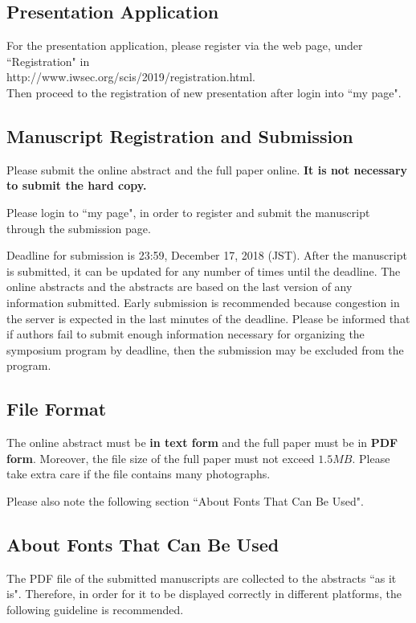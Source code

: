 \documentclass[a4paper]{article}
\begin{document}
\subsection{Presentation Application}

For the presentation application,
please register via the web page, under ``Registration" in \\ \mbox{http://www.iwsec.org/scis/2019/registration.html}.\\
Then proceed to the registration of new presentation after login into ``my page".

\subsection{Manuscript Registration and Submission}

Please submit the online abstract and the full paper online. {\bf It is not necessary to submit the hard copy.}

Please login to ``my page", in order to register and submit the manuscript through the submission page.

Deadline for submission is 23:59, December 17, 2018 (JST). 
After the manuscript is submitted, it can be updated for any number of times until the deadline.
The online abstracts and the abstracts are based on the last version of any information submitted.
Early submission is recommended because congestion in the server is expected in the last minutes of the deadline.
Please be informed that if authors fail to submit enough information necessary for organizing the symposium program
by deadline, then the submission may be excluded from the program.


\subsection{File Format}

The online abstract must be {\bf in text form} and the full paper must be in {\bf PDF form}. Moreover, the file size of the full paper must not exceed $1.5MB$. 
Please take extra care if the file contains many photographs.

Please also note the following section ``About Fonts That Can Be Used".

\subsection{About Fonts That Can Be Used}

The PDF file of the submitted manuscripts are collected to the abstracts ``as it is". Therefore, in order for it to be displayed correctly in different platforms,
the following guideline is recommended.
\end{document}
